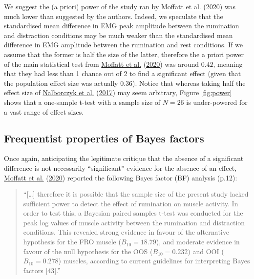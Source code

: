 \documentclass[
  english,
  man, donotrepeattitle,floatsintext]{apa6}
\begin{document}
We suggest the (a priori) power of the study ran by \protect\hyperlink{ref-moffatt_inner_2020}{Moffatt et al.} (\protect\hyperlink{ref-moffatt_inner_2020}{2020}) was much lower than suggested by the authors. Indeed, we speculate that the standardised mean difference in EMG peak amplitude between the rumination and distraction conditions may be much weaker than the standardised mean difference in EMG amplitude between the rumination and rest conditions. If we assume that the former is half the size of the latter, therefore the a priori power of the main statistical test from \protect\hyperlink{ref-moffatt_inner_2020}{Moffatt et al.} (\protect\hyperlink{ref-moffatt_inner_2020}{2020}) was around \(0.42\), meaning that they had less than 1 chance out of 2 to find a significant effect (given that the population effect size was actually \(0.36\)). Notice that whereas taking half the effect size of \protect\hyperlink{ref-nalborczyk_orofacial_2017}{Nalborczyk et al.} (\protect\hyperlink{ref-nalborczyk_orofacial_2017}{2017}) may seem arbitrary, Figure \ref{fig:power} shows that a one-sample t-test with a sample size of \(N = 26\) is under-powered for a vast range of effect sizes.

\hypertarget{frequentist-properties-of-bayes-factors}{%
\subsection{Frequentist properties of Bayes factors}\label{frequentist-properties-of-bayes-factors}}

Once again, anticipating the legitimate critique that the absence of a significant difference is not necessarily ``significant'' evidence for the absence of an effect, \protect\hyperlink{ref-moffatt_inner_2020}{Moffatt et al.} (\protect\hyperlink{ref-moffatt_inner_2020}{2020}) reported the following Bayes factor (BF) analysis (p.12):

\begin{quote}
``{[}\ldots{]} therefore it is possible that the sample size of the present study lacked sufficient power to detect the effect of rumination on muscle activity. In order to test this, a Bayesian paired samples t-test was conducted for the peak log values of muscle activity between the rumination and distraction conditions. This revealed strong evidence in favour of the alternative hypothesis for the FRO muscle (\(B_{10} = 18.79\)), and moderate evidence in favour of the null hypothesis for the OOS (\(B_{10} = 0.232\)) and OOI (\(B_{10} = 0.278\)) muscles, according to current guidelines for interpreting Bayes factors {[}43{]}.''
\end{quote}
\end{document}
